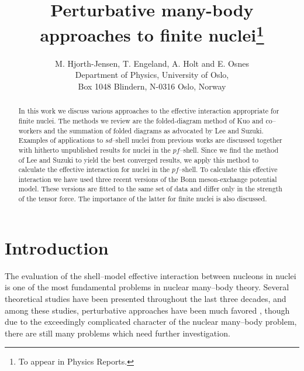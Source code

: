 


\setlength{\hoffset}{-0.5in}
\setlength{\textwidth}{6in}
\setlength{\voffset}{-0.5in}
\setlength{\textheight}{8.5in}

\newcommand{\be}{\begin{equation}}
\newcommand{\ee}{\end{equation}}
\newcommand{\bra}[1]{\left\langle #1 \right|}
\newcommand{\ket}[1]{\left| #1 \right\rangle}
\newcommand{\nl}[1]{\line(1,0){10}\raisebox{-0.6ex}{ #1}}



\pagestyle{plain}
\title{Perturbative many-body approaches to finite nuclei\thanks{To appear in Physics
Reports.} }
\author{M. Hjorth-Jensen,
T. Engeland, A. Holt and E. Osnes\\ Department of Physics,
University of Oslo, \\ Box 1048 Blindern, N-0316 Oslo, Norway}
\maketitle
\clearpage
\begin{abstract}
In this work we discuss
various approaches to the effective interaction appropriate
for finite nuclei. The methods we review
are the folded-diagram
method of Kuo and co--workers and the summation of folded diagrams
as advocated by Lee and Suzuki. Examples of applications to $sd$--shell nuclei
from previous works are discussed together with hitherto unpublished results
for nuclei in the $pf$--shell.
Since we find the method of Lee and Suzuki to yield the best converged results,
we apply this method to calculate
the effective interaction
for nuclei in the $pf$--shell.
To calculate this effective interaction we have used three recent versions
of the Bonn meson-exchange potential model. These versions are fitted to the
same set of data and differ only in the strength of the tensor force. The
importance of the latter for finite nuclei is also discussed.
\end{abstract}
\clearpage
\section{Introduction}
The evaluation of the shell--model effective interaction between nucleons
in  nuclei is one of the most fundamental problems in nuclear many--body
theory. Several theoretical studies have been presented throughout the
last three decades,
and among these studies, perturbative approaches
have been much favored \cite{eo77,kuo81,ko90}, though due to the exceedingly complicated character
of the nuclear many--body problem, there are still many problems which
need further investigation.


